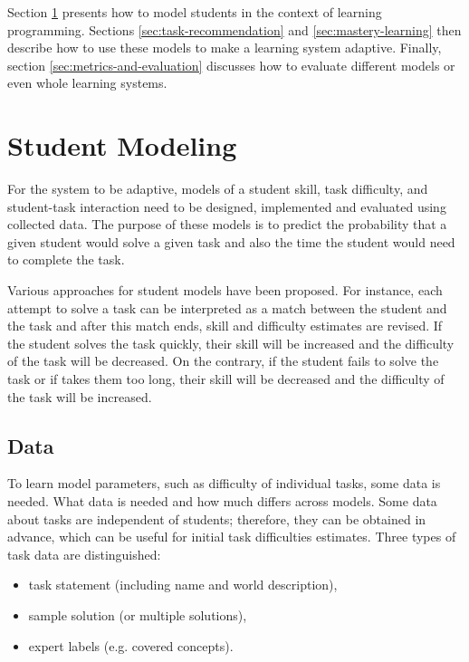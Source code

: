 Section \ref{sec:student-modeling} presents how to model students
  in the context of learning programming.
Sections \ref{sec:task-recommendation} and \ref{sec:mastery-learning}
  then describe how to use these models to make a learning system adaptive.
Finally, section \ref{sec:metrics-and-evaluation} discusses how to evaluate
  different models or even whole learning systems.


\section{Student Modeling}
\label{sec:student-modeling}

For the system to be adaptive, models of
  a student skill, task difficulty, and student-task interaction
  need to be designed, implemented and evaluated using collected data.
The purpose of these models is to predict the probability that a given student
  would solve a given task
  and also the time the student would need to complete the task.

Various approaches for student models have been proposed.
For instance, each attempt to solve a task can be interpreted
  as a match between the student and the task and after this match ends,
  skill and difficulty estimates are revised.
If the student solves the task quickly, their skill will be increased
  and the difficulty of the task will be decreased.
On the contrary, if the student fails to solve the task or if takes them too long,
  their skill will be decreased and the difficulty of the task will be increased.


\subsection{Data}
\label{sec:student-modeling.data}

To learn model parameters, such as difficulty of individual tasks, some data is needed.
What data is needed and how much differs across models.
Some data about tasks are independent of students;
therefore, they can be obtained in advance,
which can be useful for initial task difficulties estimates.
Three types of task data are distinguished:

\begin{itemize}
  \item task statement (including name and world description),
  \item sample solution (or multiple solutions),
  \item expert labels (e.g. covered concepts).
\end{itemize}

